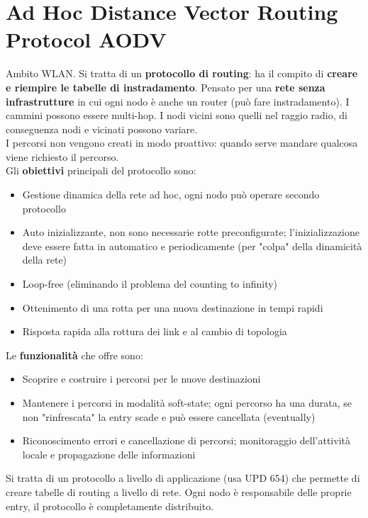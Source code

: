 
\section{Ad Hoc Distance Vector Routing Protocol AODV}

Ambito WLAN. Si tratta di un \textbf{protocollo di routing}: ha il compito di \textbf{creare e riempire le tabelle di instradamento}. Pensato per una \textbf{rete senza infrastrutture} in cui ogni nodo è anche un router (può fare instradamento). I cammini possono essere multi-hop. I nodi vicini sono quelli nel raggio radio, di conseguenza nodi e vicinati possono variare.\\
I percorsi non vengono creati in modo proattivo: quando serve mandare qualcosa viene richiesto il percorso.\\

Gli \textbf{obiettivi} principali del protocollo sono:
\begin{itemize}
	\item Gestione dinamica della rete ad hoc, ogni nodo può operare secondo protocollo
	\item Auto inizializzante, non sono necessarie rotte preconfigurate; l'inizializzazione deve essere fatta in automatico e periodicamente (per "colpa" della dinamicità della rete)
	\item Loop-free (eliminando il problema del counting to infinity)
	\item Ottenimento di una rotta per una nuova destinazione in tempi rapidi
	\item Risposta rapida alla rottura dei link e al cambio di topologia
\end{itemize}

Le \textbf{funzionalità} che offre sono:
\begin{itemize}
	\item Scoprire e costruire i percorsi per le nuove destinazioni
	\item Mantenere i percorsi in modalità soft-state; ogni percorso ha una durata, se non "rinfrescata" la entry scade e può essere cancellata (eventually)
	\item Riconoscimento errori e cancellazione di percorsi; monitoraggio dell'attività locale e propagazione delle informazioni
\end{itemize}

Si tratta di un protocollo a livello di applicazione (usa UPD 654) che permette di creare tabelle di routing a livello di rete. Ogni nodo è responsabile delle proprie entry, il protocollo è completamente distribuito.\\


